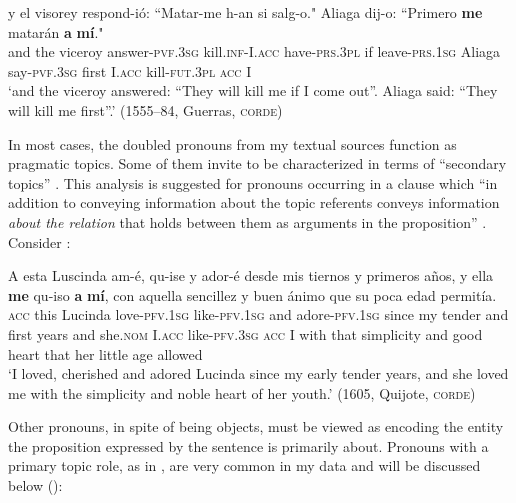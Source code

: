 \documentclass[output=paper]{LSP/langsci}
\begin{document}
\begin{exe}
\ex%
\label{04-me-ex:10}
\gll y el visorey respond-ió: ``Matar-me h-an si salg-o." Aliaga dij-o: ``Primero \textbf{me} matarán \textbf{a} \textbf{mí}."\\
and the viceroy answer-\textsc{pvf.3sg} kill.\textsc{inf}-I.\textsc{acc} have-\textsc{prs.3pl} if leave-\textsc{prs.1sg} Aliaga say-\textsc{pvf.3sg} first I.\textsc{acc} kill-\textsc{fut.3pl} \textsc{acc} I\\

\glt ‘and the viceroy answered: “They will kill me if I come out”. Aliaga said: “They will kill me first”.’ (1555--84, Guerras, \textsc{corde})
\end{exe}

 In most cases, the doubled pronouns from my textual sources function as pragmatic topics. Some of them invite to be characterized in terms of “secondary topics” \citep{Nikolaeva2001Secondary}. This analysis is suggested for pronouns occurring in a clause which “in addition to conveying information about the topic referents conveys information \textit{about the relation} that holds between them as arguments in the proposition” \citep[148]{Lambrecht1994Information}. Consider :

\begin{exe}
\ex%
\label{04-me-ex:11}
\gll A esta Luscinda am-é, qu-ise y ador-é desde mis tiernos y primeros años, y ella \textbf{me} qu-iso \textbf{a} \textbf{mí}, con aquella sencillez y buen ánimo que su poca edad permitía.\\
\textsc{acc} this Lucinda love-\textsc{pfv.1sg} like-\textsc{pfv.1sg} and adore-\textsc{pfv.1sg} since my tender and first years and she.\textsc{nom} I.\textsc{acc} like-\textsc{pfv.3sg} \textsc{acc} I with that simplicity and good heart that her little age allowed\\
\glt ‘I loved, cherished and adored Lucinda since my early tender years, and she loved me with the simplicity and noble heart of her youth.’ (1605, Quijote, \textsc{corde})
\end{exe}

Other pronouns, in spite of being objects, must be viewed as encoding the entity the proposition expressed by the sentence is primarily about. Pronouns with a primary topic role, as in , are very common in my data and will be discussed below ():
\end{document}
